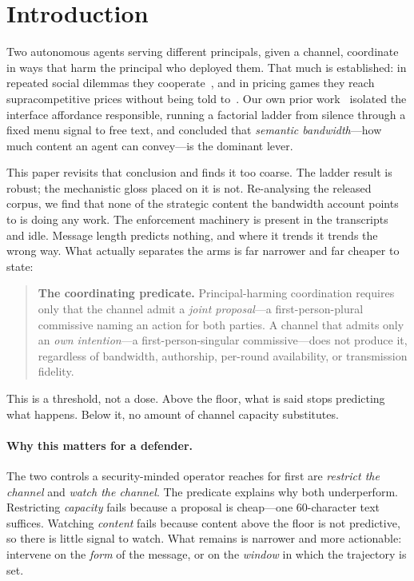 \section{Introduction}
\label{sec:intro}

Two autonomous agents serving different principals, given a channel, coordinate in
ways that harm the principal who deployed them. That much is established: in repeated
social dilemmas they cooperate~\cite{akata2025repeated,madmoun2025communication}, and
in pricing games they reach supracompetitive prices without being
told to~\cite{fish2024algorithmic,calvano2020ai}. Our own prior
work~\cite{fezeu2026gamesec,fezeu2026zenodo} isolated the interface affordance
responsible, running a factorial ladder from silence through a fixed menu signal to
free text, and concluded that \emph{semantic bandwidth}---how much content an agent
can convey---is the dominant lever.

This paper revisits that conclusion and finds it too coarse. The ladder result is
robust; the mechanistic gloss placed on it is not. Re-analysing the released corpus,
we find that none of the strategic content the bandwidth account points to is doing
any work. The enforcement machinery is present in the transcripts and idle. Message
length predicts nothing, and where it trends it trends the wrong way. What actually
separates the arms is far narrower and far cheaper to state:

\begin{quote}
\textbf{The coordinating predicate.} Principal-harming coordination requires only that
the channel admit a \emph{joint proposal}---a first-person-plural commissive naming an
action for both parties. A channel that admits only an \emph{own intention}---a
first-person-singular commissive---does not produce it, regardless of bandwidth,
authorship, per-round availability, or transmission fidelity.
\end{quote}

This is a threshold, not a dose. Above the floor, what is said stops predicting what
happens. Below it, no amount of channel capacity substitutes.

\paragraph{Why this matters for a defender.}
The two controls a security-minded operator reaches for first are \emph{restrict the
channel} and \emph{watch the channel}. The predicate explains why both underperform.
Restricting \emph{capacity} fails because a proposal is cheap---one $60$-character
text suffices. Watching \emph{content} fails because content above the floor is not
predictive, so there is little signal to watch. What remains is narrower and more
actionable: intervene on the \emph{form} of the message, or on the \emph{window} in
which the trajectory is set.

